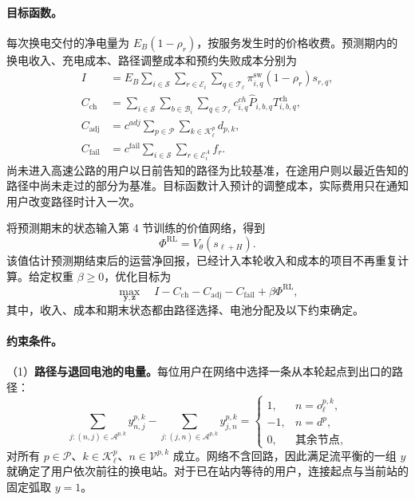 \documentclass[12pt,a4paper,UTF8]{ctexart}
\begin{document}
\paragraph{目标函数。}
每次换电交付的净电量为 $E_B(1-\rho_r)$，按服务发生时的价格收费。预测期内的换电收入、充电成本、路径调整成本和预约失败成本分别为
\begin{align}
I&=E_B\sum_{i\in\mathcal S}\sum_{r\in\mathcal E_i}
\sum_{q\in\mathcal T_\ell}\pi_{i,q}^{\mathrm{sw}}(1-\rho_r)s_{r,q},
\label{eq:income}\\
C_{\mathrm{ch}}&=\sum_{i\in\mathcal S}\sum_{b\in\mathcal B_i}
\sum_{q\in\mathcal T_\ell}c^{ch}_{i,q}\widehat P_{i,b,q}T_{i,b,q}^{\mathrm{ch}},
\label{eq:chargingcost}\\
C_{\mathrm{adj}}&=c^{adj}\sum_{p\in\mathcal P}\sum_{k\in\mathcal K_\ell^p}d_{p,k},
\label{eq:adjustment_cost}\\
C_{\mathrm{fail}}&=c^{\mathrm{fail}}\sum_{i\in\mathcal S}\sum_{r\in\mathcal E_i^A}f_r.
\label{eq:reservation_failure_cost}
\end{align}
尚未进入高速公路的用户以日前告知的路径为比较基准，在途用户则以最近告知的路径中尚未走过的部分为基准。目标函数计入预计的调整成本，实际费用只在通知用户改变路径时计入一次。

将预测期末的状态输入第 4 节训练的价值网络，得到
\begin{equation}
\Phi^{\mathrm{RL}}=V_\theta(s_{\ell+H}).
\label{eq:rl_terminal_value}
\end{equation}
该值估计预测期结束后的运营净回报，已经计入本轮收入和成本的项目不再重复计算。给定权重 $\beta\ge0$，优化目标为
\begin{equation}
\max_{\mathbf y,\mathbf z}\quad
I-C_{\mathrm{ch}}-C_{\mathrm{adj}}-C_{\mathrm{fail}}+\beta\Phi^{\mathrm{RL}},
\label{eq:objective}
\end{equation}
其中，收入、成本和期末状态都由路径选择、电池分配及以下约束确定。

\paragraph{约束条件。}
（1）\textbf{路径与退回电池的电量。}每位用户在网络中选择一条从本轮起点到出口的路径：
\begin{equation}
\sum_{j:(n,j)\in\mathcal A^{p,k}}y_{n,j}^{p,k}
-\sum_{j:(j,n)\in\mathcal A^{p,k}}y_{j,n}^{p,k}
=\begin{cases}
1,&n=o_\ell^{p,k},\\
-1,&n=d^p,\\
0,&\text{其余节点},
\end{cases}
\label{eq:flow}
\end{equation}
对所有 $p\in\mathcal P$、$k\in\mathcal K_\ell^p$、$n\in\mathcal V^{p,k}$ 成立。网络不含回路，因此满足流平衡的一组 $y$ 就确定了用户依次前往的换电站。对于已在站内等待的用户，连接起点与当前站的固定弧取 $y=1$。
\end{document}
